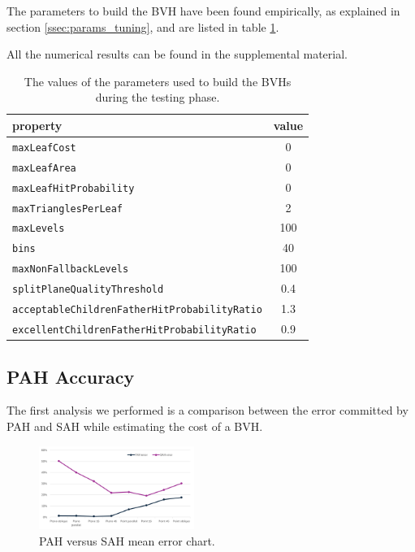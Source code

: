 \documentclass[acmtog, anonymous, review]{acmart}
\begin{document}
The parameters to build the BVH have been found empirically, as explained in section \ref{ssec:params_tuning}, and are listed in table \ref{tab:standard_properties}.

All the numerical results can be found in the supplemental material.

\begin{table}
  \caption{The values of the parameters used to build the BVHs during the testing phase.}
	\centering
	\begin{tabular}{| l | c |}
		\hline
		\textbf{property} & \textbf{value}\\
		\hline
		\hline
		\texttt{maxLeafCost} & 0\\
		\texttt{maxLeafArea} & 0\\
		\texttt{maxLeafHitProbability} & 0\\
		\texttt{maxTrianglesPerLeaf} & 2\\
		\texttt{maxLevels} & 100\\
		\texttt{bins} & 40\\
		\texttt{maxNonFallbackLevels} & 100\\
		\texttt{splitPlaneQualityThreshold} & 0.4\\
		\texttt{acceptableChildrenFatherHitProbabilityRatio} & 1.3\\
		\texttt{excellentChildrenFatherHitProbabilityRatio} & 0.9\\
		\hline
	\end{tabular}
	\label{tab:standard_properties}
\end{table}

\subsection{PAH Accuracy}
The first analysis we performed is a comparison between the error committed by PAH and SAH while estimating the cost of a BVH. 

\begin{figure}[H]
  \centering
  \includegraphics[width=0.45\textwidth]{Images/pah_accuracy_chart.png}
  \caption{PAH versus SAH mean error chart.}
  \label{fig:pah_accuracy} 
\end{figure}
\end{document}
